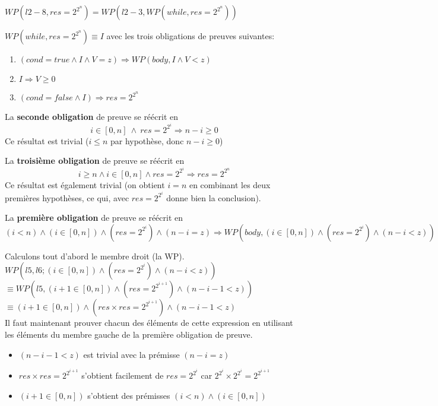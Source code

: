 \documentclass[10pt]{article}\usepackage[correction,nu]{esial}
\begin{document}
\begin{Reponse}
  $WP(l2-8,res=2^{2^n})=WP(l2-3,WP(while,res=2^{2^n}))$


  $WP(while,res=2^{2^n})\equiv I$ avec les trois obligations de preuves
  suivantes:
  \begin{enumerate}
  \item $(cond=true \wedge I \wedge V=z) \Rightarrow WP(body, I \wedge V<z)$
  \item $I\Rightarrow V\geq 0$
  \item $(cond=false \wedge I) \Rightarrow res=2^{2^n}$
  \end{enumerate}

  \noindent La \textbf{seconde obligation} de preuve se réécrit en 
  $$i\in[0,n] ~\wedge~ res=2^{2^i} \Rightarrow n-i\geq 0$$
  Ce résultat est trivial ($i\leq n$ par hypothèse, donc $n-i\geq0$)

  \medskip\noindent La \textbf{troisième obligation} de preuve se réécrit en 
  $$i\geq n \wedge i\in[0,n] \wedge res=2^{2^i} \Rightarrow res=2^{2^{n}}$$
  Ce résultat est également trivial (on obtient $i=n$ en combinant les deux
  premières  hypothèses, ce qui, avec $res=2^{2^i}$ donne bien la conclusion).

  \medskip\noindent La \textbf{première obligation} de preuve se réécrit en 
  $$(i<n) \wedge (i\in[0,n]) \wedge (res=2^{2^i}) \wedge (n-i=z) \Rightarrow 
  WP(body,(i\in[0,n]) \wedge (res=2^{2^i}) \wedge (n-i<z))$$

  Calculons tout d'abord le membre droit (la WP).\\
  $WP(l5,l6; (i\in[0,n]) \wedge (res=2^{2^i}) \wedge (n-i<z))$\\
  $\equiv WP(l5,(i+1\in[0,n]) \wedge (res=2^{2^{i+1}}) \wedge (n-i-1<z))$\\
  $\equiv (i+1\in[0,n]) \wedge (res\times res=2^{2^{i+1}}) \wedge (n-i-1<z)$\\
  
  Il faut maintenant prouver chacun des éléments de cette expression en
  utilisant les éléments du membre gauche de la première obligation de preuve.
  \begin{itemize}
  \item $(n-i-1<z)$ est trivial avec la prémisse $(n-i=z)$
  \item $res\times res=2^{2^{i+1}}$ s'obtient facilement de $res=2^{2^i}$ car
    $2^{2^i}\times 2^{2^i}=2^{2^{i+1}}$
  \item $(i+1\in[0,n])$ s'obtient des prémisses $(i<n) \wedge (i\in[0,n])$
  \end{itemize}


\end{Reponse}
\end{document}
